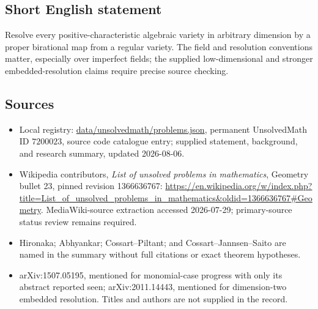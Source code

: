 \documentclass[11pt]{article}
\begin{document}
\subsection{Short English statement}
Resolve every positive-characteristic algebraic variety in arbitrary dimension by a proper birational map from a regular variety. The field and resolution conventions matter, especially over imperfect fields; the supplied low-dimensional and stronger embedded-resolution claims require precise source checking.
\subsection{Sources}
\begin{itemize}
\item Local registry: \url{data/unsolvedmath/problems.json}, permanent UnsolvedMath ID \(7200023\), source code catalogue entry; supplied statement, background, and research summary, updated 2026-08-06.
\item Wikipedia contributors, \emph{List of unsolved problems in mathematics}, Geometry bullet 23, pinned revision 1366636767: \url{https://en.wikipedia.org/w/index.php?title=List_of_unsolved_problems_in_mathematics&oldid=1366636767#Geometry}. MediaWiki-source extraction accessed 2026-07-29; primary-source status review remains required.
\item Hironaka; Abhyankar; Cossart--Piltant; and Cossart--Jannsen--Saito are named in the summary without full citations or exact theorem hypotheses.
\item arXiv:1507.05195, mentioned for monomial-case progress with only its abstract reported seen; arXiv:2011.14443, mentioned for dimension-two embedded resolution. Titles and authors are not supplied in the record.
\end{itemize}
\end{document}
